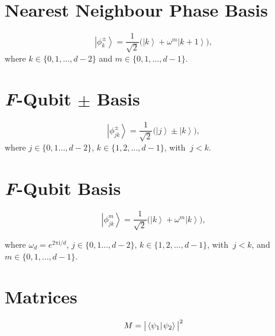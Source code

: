 \documentclass[]{article}
\newcommand{\ket}[1]{\left| #1 \right\rangle}
\newcommand{\braket}[2]{\left\langle {#1{\left|\vphantom{#1 #2} \right.} #2} \right\rangle}
\begin{document}
\section{Nearest Neighbour Phase Basis}
\begin{equation}
\ket{\phi_k^{\pm}} = \frac{1}{\sqrt{2}}\big( \ket{k} + \omega^{m}\ket{k+1} \big),
\end{equation}
where $k\in\{0,1,...,d-2\}$ and $m \in \{0,1,...,d-1\}$.

\section{\textit{F}-Qubit $\pm$ Basis}

\begin{equation}
\ket{\phi_{jk}^{\pm}} = \frac{1}{\sqrt{2}} \big(\ket{j} \pm \ket{k}\big),
\end{equation}
where ${j \in\{0,1...,d-2\}}$, ${k\in\{1,2,...,d-1\}}$, with ${\: j< k}$.

\section{\textit{F}-Qubit Basis}
\begin{equation}
\ket{\phi_{jk}^{m}} = \frac{1}{\sqrt{2}}\big(\ket{k} + \omega^{m}\ket{k}\big),
\end{equation}

where ${\omega_d= e^{2 \mathrm{\pi i} /d }}$, ${j \in\{0,1...,d-2\}}$, ${k\in\{1,2,...,d-1\}}$, with ${\: j< k}$, and ${m\in\{0,1,...,d-1\}}$.


\section{Matrices}
\begin{equation}
M=\big|\braket{\psi_1}{\psi_2} \big|^2
\end{equation}
\end{document}
